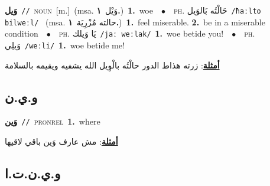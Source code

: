 \documentclass[10pt,a4paper,twoside]{article} %
\begin{document}
\begin{multicols}{2}
{\setlength\topsep{0pt}\textbf{\foreignlanguage{arabic}{وَيل}}\ {\color{gray}\texttt{//}\color{black}}\ \textsc{noun}\ [m.]\ \color{gray}(msa. \foreignlanguage{arabic}{وَيْل}~\foreignlanguage{arabic}{\textbf{١.}})\color{black}\ \textbf{1.}~woe\ \ $\bullet$\ \ \textsc{ph.} \color{gray} \foreignlanguage{arabic}{حَالْتُه بَالوَيل}\color{black}\ {\color{gray}\texttt{/{\sffamily ħaːlto bilweːl}/}\color{black}}\ \color{gray} (msa. \foreignlanguage{arabic}{حالته مُزْرِيَة}~\foreignlanguage{arabic}{\textbf{١.}})\color{black}\ \textbf{1.}~feel miserable.  \textbf{2.}~be in a miserable condition\ \ $\bullet$\ \ \textsc{ph.} \color{gray} \foreignlanguage{arabic}{يَا وَيلك}\color{black}\ {\color{gray}\texttt{/{\sffamily jaː weːlak}/}\color{black}}\ \textbf{1.}~woe betide you!\ \ $\bullet$\ \ \textsc{ph.} \color{gray} \foreignlanguage{arabic}{وَيلِي}\color{black}\ {\color{gray}\texttt{/{\sffamily weːli}/}\color{black}}\ \textbf{1.}~woe betide me!\  \begin{flushright}\color{gray}\foreignlanguage{arabic}{\textbf{\underline{\foreignlanguage{arabic}{أمثلة}}}: زرته هذاط الدور حالْتُه بالْوِيل الله يشفيه ويقيمه بالسلامة}\end{flushright}\color{black}} \vspace{2mm}

\vspace{-3mm}
\subsection*{\color{blue}\foreignlanguage{arabic}{و.ي.ن}\color{blue}{ (ntws)}} 

{\setlength\topsep{0pt}\textbf{\foreignlanguage{arabic}{وَين}}\ {\color{gray}\texttt{//}\color{black}}\ \textsc{pron\textunderscore rel}\ \textbf{1.}~where\  \begin{flushright}\color{gray}\foreignlanguage{arabic}{\textbf{\underline{\foreignlanguage{arabic}{أمثلة}}}: مش عارف وَين باقي لاقيها}\end{flushright}\color{black}} \vspace{2mm}

\vspace{-3mm}
\subsection*{\color{blue}\foreignlanguage{arabic}{و.ي.ن.ت.ا}\color{blue}{ (ntws)}} 


\end{multicols}
\end{document}
